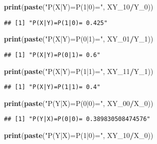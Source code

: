 \documentclass[]{article}
\newenvironment{Shaded}{\begin{snugshade}}{\end{snugshade}}
\newcommand{\KeywordTok}[1]{\textcolor[rgb]{0.13,0.29,0.53}{\textbf{#1}}}
\newcommand{\DecValTok}[1]{\textcolor[rgb]{0.00,0.00,0.81}{#1}}
\newcommand{\StringTok}[1]{\textcolor[rgb]{0.31,0.60,0.02}{#1}}
\newcommand{\OperatorTok}[1]{\textcolor[rgb]{0.81,0.36,0.00}{\textbf{#1}}}
\newcommand{\NormalTok}[1]{#1}
\begin{document}
\begin{Shaded}
\begin{Highlighting}[]
\KeywordTok{print}\NormalTok{(}\KeywordTok{paste}\NormalTok{(}\StringTok{"P(X|Y)=P(1|0)="}\NormalTok{, XY_}\DecValTok{10}\OperatorTok{/}\NormalTok{Y_}\DecValTok{0}\NormalTok{))}
\end{Highlighting}
\end{Shaded}

\begin{verbatim}
## [1] "P(X|Y)=P(1|0)= 0.425"
\end{verbatim}

\begin{Shaded}
\begin{Highlighting}[]
\KeywordTok{print}\NormalTok{(}\KeywordTok{paste}\NormalTok{(}\StringTok{"P(X|Y)=P(0|1)="}\NormalTok{, XY_}\DecValTok{01}\OperatorTok{/}\NormalTok{Y_}\DecValTok{1}\NormalTok{))}
\end{Highlighting}
\end{Shaded}

\begin{verbatim}
## [1] "P(X|Y)=P(0|1)= 0.6"
\end{verbatim}

\begin{Shaded}
\begin{Highlighting}[]
\KeywordTok{print}\NormalTok{(}\KeywordTok{paste}\NormalTok{(}\StringTok{"P(X|Y)=P(1|1)="}\NormalTok{, XY_}\DecValTok{11}\OperatorTok{/}\NormalTok{Y_}\DecValTok{1}\NormalTok{))}
\end{Highlighting}
\end{Shaded}

\begin{verbatim}
## [1] "P(X|Y)=P(1|1)= 0.4"
\end{verbatim}

\begin{Shaded}
\begin{Highlighting}[]
\KeywordTok{print}\NormalTok{(}\KeywordTok{paste}\NormalTok{(}\StringTok{"P(Y|X)=P(0|0)="}\NormalTok{, XY_}\DecValTok{00}\OperatorTok{/}\NormalTok{X_}\DecValTok{0}\NormalTok{))}
\end{Highlighting}
\end{Shaded}

\begin{verbatim}
## [1] "P(Y|X)=P(0|0)= 0.389830508474576"
\end{verbatim}

\begin{Shaded}
\begin{Highlighting}[]
\KeywordTok{print}\NormalTok{(}\KeywordTok{paste}\NormalTok{(}\StringTok{"P(Y|X)=P(1|0)="}\NormalTok{, XY_}\DecValTok{10}\OperatorTok{/}\NormalTok{X_}\DecValTok{0}\NormalTok{))}
\end{Highlighting}
\end{Shaded}
\end{document}
